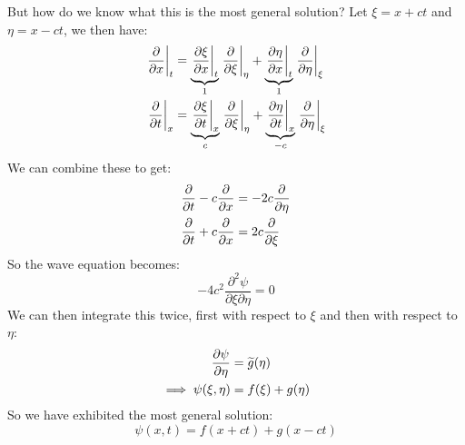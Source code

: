 \documentclass[../main.tex]{subfiles}
\begin{document}
But how do we know what this is the most general solution?
Let $\xi = x + ct$ and $\eta = x - ct$, we then have:
\begin{align*}
  \at{\pderiv{}{x}}{t} &= \underbrace{\at{\pderiv{\xi}{x}}{t}}_{1} \at{\pderiv{}{\xi}}{\eta} + \underbrace{\at{\pderiv{\eta}{x}}{t}}_{1} \at{\pderiv{}{\eta}}{\xi} \\
  \at{\pderiv{}{t}}{x} &= \underbrace{\at{\pderiv{\xi}{t}}{x}}_{c} \at{\pderiv{}{\xi}}{\eta} + \underbrace{\at{\pderiv{\eta}{t}}{x}}_{-c} \at{\pderiv{}{\eta}}{\xi}
\end{align*}
We can combine these to get:
\begin{align*}
  \pderiv{}{t} - c \pderiv{}{x} &= -2c \pderiv{}{\eta} \\
  \pderiv{}{t} + c \pderiv{}{x} &= 2c \pderiv{}{\xi}
\end{align*}
So the wave equation becomes:
\[
  -4c^2 \frac{\partial^2 \psi}{\partial \xi \partial \eta} = 0
\]
We can then integrate this twice, first with respect to $\xi$ and then with respect to $\eta$:
\begin{align*}
  \pderiv{\psi}{\eta} &= \widetilde{g}(\eta) \\
  \implies \psi(\xi, \eta) &= f(\xi) + g(\eta)
\end{align*}
So we have exhibited the most general solution:
\[
  \psi(x, t) = f(x + ct) + g(x - ct)
\]
\end{document}
